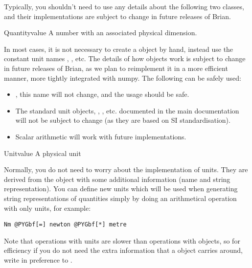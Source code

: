 \documentclass[letterpaper,10pt,english]{manual}
\begin{document}
Typically, you shouldn't need to use any details about the following
two classes, and their implementations are subject to change in
future releases of Brian.

\hypertarget{brian.Quantity}{}\begin{classdesc}{Quantity}{value}
A number with an associated physical dimension.

In most cases, it is not necessary to create a \hyperlink{brian.Quantity}{} object
by hand, instead use the constant unit names , ,
etc. The details of how \hyperlink{brian.Quantity}{} objects work is subject to
change in future releases of Brian, as we plan to reimplement it
in a more efficient manner, more tightly integrated with numpy. The
following can be safely used:
\begin{itemize}
\item {} 
\hyperlink{brian.Quantity}{}, this name will not change, and the usage
 should be safe.

\item {} 
The standard unit objects, , , etc.
documented in the main documentation will not be subject
to change (as they are based on SI standardisation).

\item {} 
Scalar arithmetic will work with future implementations.

\end{itemize}
\end{classdesc}

\hypertarget{brian.Unit}{}\begin{classdesc}{Unit}{value}
A physical unit

Normally, you do not need to worry about the implementation of
units. They are derived from the \hyperlink{brian.Quantity}{} object with
some additional information (name and string representation).
You can define new units which will be used when generating
string representations of quantities simply by doing an
arithmetical operation with only units, for example:

\begin{Verbatim}[commandchars=@\[\]]
Nm @PYGbf[=] newton @PYGbf[*] metre
\end{Verbatim}

Note that operations with units are slower than operations with
\hyperlink{brian.Quantity}{} objects, so for efficiency if you do not need the
extra information that a \hyperlink{brian.Unit}{} object carries around, write
 in preference to .
\end{classdesc}
\resetcurrentobjects
\hypertarget{--doc-reference-clocks}{}
\end{document}
